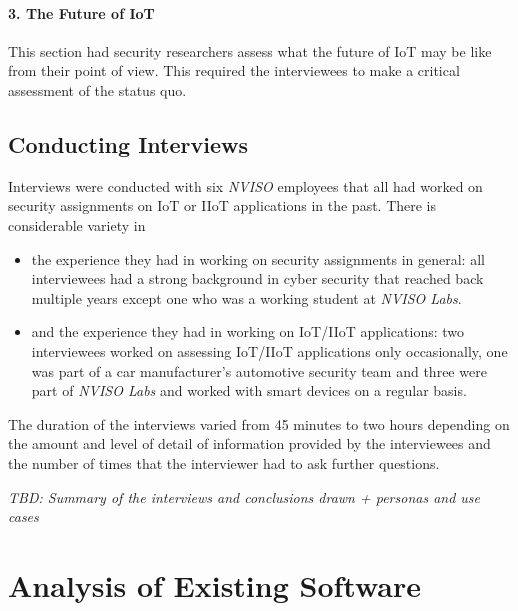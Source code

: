 \paragraph{3. The Future of IoT} This section had security researchers assess what the future of IoT may be like from their point of view. This required the interviewees to make a critical assessment of the status quo.



\subsection{Conducting Interviews}
Interviews were conducted with six %
\emph{NVISO} employees that all had worked on security assignments on \ac{IoT} or \ac{IIoT} applications in the past. There is considerable variety in
\begin{itemize}
    \item the experience they had in working on security assignments in general: all interviewees had a strong background in cyber security that reached back multiple years except one who was a working student at \emph{NVISO Labs}.
    \item and the experience they had in working on \ac{IoT}/\ac{IIoT} applications: two interviewees worked on assessing \ac{IoT}/\ac{IIoT} applications only occasionally, one was part of a car manufacturer's automotive security team and three were part of \emph{NVISO Labs} and worked with smart devices on a regular basis.
\end{itemize}
The duration of the interviews varied from 45 minutes to two hours depending on the amount and level of detail of information provided by the interviewees and the number of times that the interviewer had to ask further questions.

\emph{TBD: Summary of the interviews and conclusions drawn + personas and use cases}

\section{Analysis of Existing Software}
